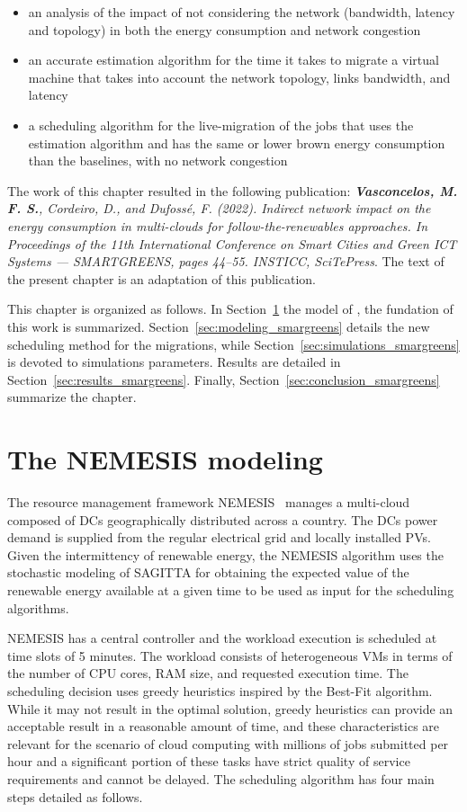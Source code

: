 \begin{itemize}
    \item an analysis of the impact of not considering the network (bandwidth, latency and topology) in both the energy consumption and network congestion
    \item an accurate estimation algorithm for the time it takes to migrate a virtual machine that takes into account the network topology, links bandwidth, and latency
    \item a scheduling algorithm for the live-migration of the jobs that uses the estimation algorithm and has the same or lower brown energy consumption than the baselines, with no network congestion
\end{itemize}


The work of this chapter resulted in the following publication:  \textit{\textbf{Vasconcelos, M. F. S.}, Cordeiro, D., and Dufossé, F. (2022). Indirect network impact on the energy consumption in multi-clouds for follow-the-renewables approaches. In Proceedings of the 11th International Conference on Smart Cities and Green ICT Systems — SMARTGREENS, pages 44–55. INSTICC, SciTePress}. The text of the present chapter is an adaptation of this publication.

This chapter is organized as follows. In Section~\ref{sec:nemesis} the model of \cite{NEMESIS}, the fundation of this work is summarized. Section~\ref{sec:modeling_smargreens} details the new scheduling method for the migrations, while Section~\ref{sec:simulations_smargreens} is devoted to simulations parameters. Results are detailed in Section~\ref{sec:results_smargreens}. Finally, Section~\ref{sec:conclusion_smargreens} summarize the chapter.


\section{The NEMESIS modeling}
\label{sec:nemesis}

The resource management framework NEMESIS~\cite{NEMESIS} manages a multi-cloud composed of DCs geographically distributed across a country. The DCs power demand is supplied from the regular electrical grid and locally installed PVs. Given the intermittency of renewable energy, the NEMESIS algorithm uses the stochastic modeling of SAGITTA \cite{SAGITTA} for obtaining the expected value of the renewable energy available at a given time to be used as input for the scheduling algorithms.

NEMESIS has a central controller and the workload execution is scheduled at time slots of 5 minutes. The workload consists of heterogeneous VMs in terms of the number of CPU cores, RAM size, and requested execution time. The scheduling decision uses greedy heuristics inspired by the Best-Fit algorithm. While it may not result in the optimal solution, greedy heuristics can provide an acceptable result in a reasonable amount of time, and these characteristics are relevant for the scenario of cloud computing with millions of jobs submitted per hour and a significant portion of these tasks have strict quality of service requirements and cannot be delayed.  The scheduling algorithm has four main steps detailed as follows. 

